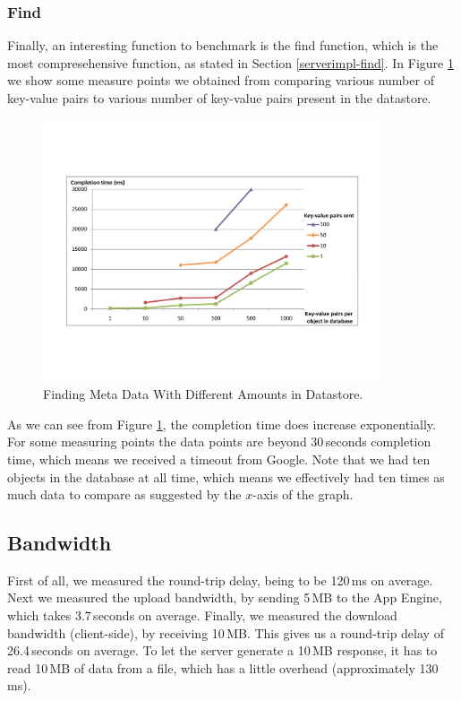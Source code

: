 \subsubsection{Find}
Finally, an interesting function to benchmark is the find function, which is the
most compresehensive function, as stated in Section \ref{serverimpl-find}. In
Figure \ref{find-md-amt} we show some measure points we obtained from comparing
various number of key-value pairs to various number of key-value pairs present in
the datastore.

\begin{figure} %
\begin{center}
\includegraphics[trim=5cm 4cm 5cm 5cm,width=10cm]{./figures/find_amt.pdf}
\caption{Finding Meta Data With Different Amounts in Datastore.
\label{find-md-amt}}
\end{center}
\end{figure}

As we can see from Figure \ref{find-md-amt}, the completion time does increase
exponentially. For some measuring points the data points are beyond 30\,seconds
completion time, which means we received a timeout from Google. Note that we had
ten objects in the database at all time, which means we effectively had ten times
as much data to compare as suggested by the $x$-axis of the graph.

\subsection{Bandwidth}
First of all, we measured the round-trip delay, being to be 120\,ms on average.
Next we measured the upload bandwidth, by sending 5\,MB to the App Engine, which
takes 3.7\,seconds on average. Finally, we measured the download bandwidth
(client-side), by receiving 10\,MB. This gives us a round-trip delay of
26.4\,seconds on average. To let the server generate a 10\,MB response, it has to
read 10\,MB of data from a file, which has a little overhead (approximately
130\,ms).
 
